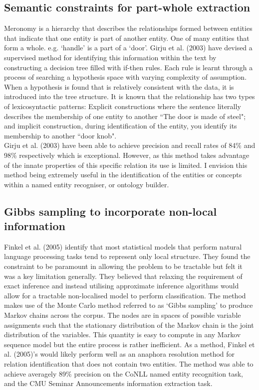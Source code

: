 \documentclass[12pt]{article} %
\begin{document}
\subsection{Semantic constraints for part-whole extraction}

Meronomy is a hierarchy that describes the relationships formed between entities that indicate that one entity is part of another entity. One of many entities that form a whole. e.g. ‘handle’ is a part of a ‘door’. Girju et al. (2003) have devised a supervised method for identifying this information within the text by constructing a decision tree filled with if-then rules. Each rule is learnt through a process of searching a hypothesis space with varying complexity of assumption. When a hypothesis is found that is relatively consistent with the data, it is introduced into the tree structure. It is known that the relationship has two types of lexicosyntactic patterns: Explicit constructions where the sentence literally describes the membership of one entity to another ``The door is made of steel"; and implicit construction, during identification of the entity, you identify its membership to another ``door knob".\\ 

Girju et al. (2003) have been able to achieve precision and recall rates of 84\% and 98\% respectively which is exceptional. However, as this method takes advantage of the innate properties of this specific relation its use is limited. I envision this method being extremely useful in the identification of the entities or concepts within a named entity recogniser, or ontology builder.

\subsection{Gibbs sampling to incorporate non-local information}

Finkel et al. (2005) identify that most statistical models that perform natural language processing tasks tend to represent only local structure. They found the constraint to be paramount in allowing the problem to be tractable but felt it was a key limitation generally. They believed that relaxing the requirement of exact inference and instead utilising approximate inference algorithms would allow for a tractable non-localised model to perform classification. The method makes use of the Monte Carlo method referred to as ‘Gibbs sampling’ to produce Markov chains across the corpus. The nodes are in spaces of possible variable assignments such that the stationary distribution of the Markov chain is the joint distribution of the variables. This quantity is easy to compute in any Markov sequence model but the entire process is rather inefficient. As a method, Finkel et al. (2005)’s would likely perform well as an anaphora resolution method for relation identification that does not contain two entities. The method was able to achieve averagely 89\% precision on the CoNLL named entity recognition task, and the CMU Seminar Announcements information extraction task.
\end{document}
